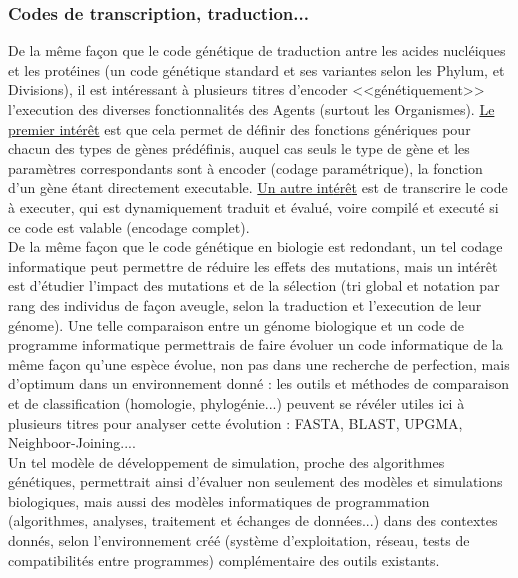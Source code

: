 \documentclass[11pt,twoside,a4paper]{article}
\begin{document}
\subsubsection{Codes de transcription, traduction...}

De la m{\^e}me fa\c{c}on que le code g{\'e}n{\'e}tique de traduction antre les acides nucl{\'e}iques et les prot{\'e}ines (un code g{\'e}n{\'e}tique standard et ses variantes selon les Phylum, et Divisions), il est int{\'e}ressant {\`a} plusieurs titres d'encoder <<g{\'e}n{\'e}tiquement>> l'execution des diverses fonctionnalit{\'e}s des Agents (surtout les Organismes). \underline{Le premier int{\'e}r{\^e}t} est que cela permet de d{\'e}finir des fonctions g{\'e}n{\'e}riques pour chacun des types de g{\`e}nes pr{\'e}d{\'e}finis, auquel cas seuls le type de g{\`e}ne et les param{\`e}tres correspondants sont {\`a} encoder (codage param{\'e}trique), la fonction d'un g{\`e}ne {\'e}tant directement executable. \underline{Un autre int{\'e}r{\^e}t} est de transcrire le code {\`a} executer, qui est dynamiquement traduit et {\'e}valu{\'e}, voire compil{\'e} et execut{\'e} si ce code est valable (encodage complet).~\\

De la m{\^e}me fa\c{c}on que le code g{\'e}n{\'e}tique en biologie est redondant, un tel codage informatique peut permettre de r{\'e}duire les effets des mutations, mais un int{\'e}r{\^e}t est d'{\'e}tudier l'impact des mutations et de la s{\'e}lection (tri global et notation par rang des individus de fa\c{c}on aveugle, selon la traduction et l'execution de leur g{\'e}nome). Une telle comparaison entre un g{\'e}nome biologique et un code de programme informatique permettrais de faire {\'e}voluer un code informatique de la m{\^e}me fa\c{c}on qu'une esp{\`e}ce {\'e}volue, non pas dans une recherche de perfection, mais d'optimum dans un environnement donn{\'e} : les outils et m{\'e}thodes  de comparaison et de classification (homologie, phylog{\'e}nie...) peuvent se r{\'e}v{\'e}ler utiles ici {\`a} plusieurs titres pour analyser cette {\'e}volution : FASTA, BLAST, UPGMA, Neighboor-Joining....~\\

Un tel mod{\`e}le de d{\'e}veloppement de simulation, proche des algorithmes g{\'e}n{\'e}tiques, permettrait ainsi d'{\'e}valuer non seulement des mod{\`e}les et simulations biologiques, mais aussi des mod{\`e}les informatiques de programmation (algorithmes, analyses, traitement et {\'e}changes de donn{\'e}es...) dans des contextes donn{\'e}s, selon l'environnement cr{\'e}{\'e} (syst{\`e}me d'exploitation, r{\'e}seau, tests de compatibilit{\'e}s entre programmes) compl{\'e}mentaire des outils existants. 
\end{document}
